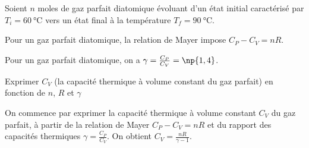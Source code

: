 
\hauteurLargeurCadreReponse		{8mm}{4cm}
\typeEntrainement				{} %
\initialisationEntrainement

Soient $n$ moles de gaz parfait diatomique évoluant d'un état initial caractérisé par $T_i=\SI{60}{\celsius}$ vers un état final à la température $T_f=\SI{90}{\celsius}$.  

Pour un gaz parfait diatomique, la relation de Mayer impose 
\(
C_P-C_V=nR.
\)

Pour un gaz parfait diatomique, on a $\gamma=\frac{C_P}{C_V}=\np{1,4}$.

\medskip

\debutEntrainement


\begin{enonce}
Exprimer $C_V$ (la capacité thermique à volume constant du gaz parfait) en fonction de $n$, $R$ et $\gamma$

\end{enonce}


\begin{corrige}
On commence par exprimer la capacité thermique à volume constant $C_V$ du gaz parfait, à partir de la relation de Mayer $C_P-C_V=nR$ et du rapport des capacités thermiques $\gamma=\frac{C_P}{C_V}$.
On obtient $C_V=\frac{nR}{\gamma - 1}$.
\end{corrige}



